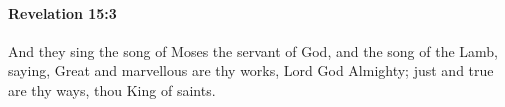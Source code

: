 			\begin{framed}
			\scriptsize
				\begin{compactdesc}
					\item[SBLG] 
				\end{compactdesc}
			\end{framed}

		\paragraph{Revelation 15:3} %
			\label{REVELATIONNT-15-3}

			And they sing the song of Moses the servant of God, and the song of the Lamb, saying, Great and marvellous are thy works, Lord God Almighty; just and true are thy ways, thou King of saints.

